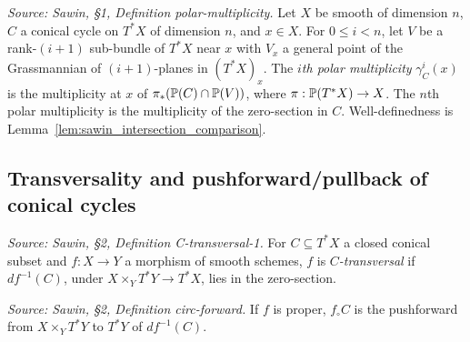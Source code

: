 \begin{definition}
  \label{def:sawin_polar_multiplicity}
  \textit{Source: Sawin, §1, Definition polar-multiplicity.}
  Let $X$ be smooth of dimension $n$, $C$ a conical cycle on $T^*X$ of dimension
  $n$, and $x\in X$.  For $0\le i<n$, let $V$ be a rank-$(i+1)$ sub-bundle of
  $T^*X$ near $x$ with $V_x$ a general point of the Grassmannian of
  $(i+1)$-planes in $(T^*X)_x$.  The \emph{$i$th polar multiplicity}
  $\gamma^i_C(x)$ is the multiplicity at $x$ of $\pi_*(\mathbb{P}(C)\cap\mathbb{P}(V))$, where
  $\pi:\mathbb{P}(T^*X)\to X$.  The $n$th polar multiplicity is the multiplicity of the
  zero-section in $C$.  Well-definedness is Lemma~\ref{lem:sawin_intersection_comparison}.
\end{definition}

\subsection{Transversality and pushforward/pullback of conical cycles}

\begin{definition}
  \label{def:sawin_C_transversal_map}
  \textit{Source: Sawin, §2, Definition C-transversal-1.}
  For $C\subseteq T^*X$ a closed conical subset and $f:X\to Y$ a morphism of
  smooth schemes, $f$ is \emph{$C$-transversal} if $df^{-1}(C)$, under
  $X\times_Y T^*Y \to T^*X$, lies in the zero-section.
\end{definition}

\begin{definition}
  \label{def:sawin_circ_forward}
  \textit{Source: Sawin, §2, Definition circ-forward.}
  If $f$ is proper, $f_\circ C$ is the pushforward from $X\times_Y T^*Y$ to
  $T^*Y$ of $df^{-1}(C)$.
\end{definition}

